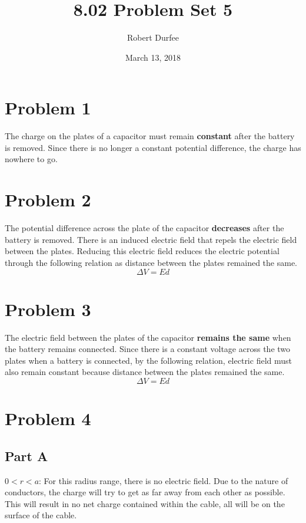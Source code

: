 \documentclass{article}
\title{ 8.02 Problem Set 5 }
\author{ Robert Durfee }
\date{ March 13, 2018 }
\begin{document}
\maketitle

\section*{Problem 1 }

The charge on the plates of a capacitor must remain \textbf{constant} after the
battery is removed. Since there is no longer a constant potential difference,
the charge has nowhere to go.

\section*{Problem 2}

The potential difference across the plate of the capacitor \textbf{decreases}
after the battery is removed.  There is an induced electric field that repels
the electric field between the plates. Reducing this electric field reduces the
electric potential through the following relation as distance between the plates
remained the same.
$$ \Delta V = Ed $$

\section*{Problem 3}

The electric field between the plates of the capacitor \textbf{remains the same}
when the battery remains connected. Since there is a constant voltage across the
two plates when a battery is connected, by the following relation, electric
field must also remain constant because distance between the plates remained
the same.
$$ \Delta V = E d $$

\section*{Problem 4}

\subsection*{Part A}

$0 < r < a$: For this radius range, there is no electric field. Due to the
nature of conductors, the charge will try to get as far away from each other as
possible. This will result in no net charge contained within the cable, all will
be on the surface of the cable.
\end{document}
